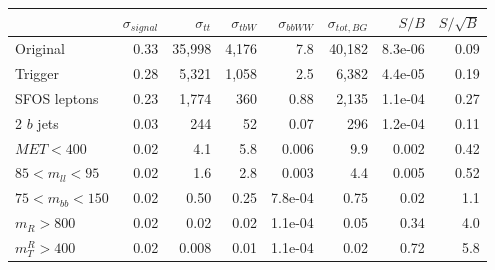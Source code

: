\begin{tabular}{lrrrrrrr}
\toprule
{} &  $\sigma_{signal}$ &  $\sigma_{tt}$ &  $\sigma_{tbW}$ &  $\sigma_{bbWW}$ &  $\sigma_{tot, BG}$ &   $S/B$ &  $S/\sqrt{B}$ \\
\midrule
Original            &               0.33 &         35,998 &           4,176 &              7.8 &             40,182 & 8.3e-06 &          0.09 \\
Trigger             &               0.28 &          5,321 &           1,058 &              2.5 &              6,382 & 4.4e-05 &          0.19 \\
SFOS leptons        &               0.23 &          1,774 &             360 &             0.88 &              2,135 & 1.1e-04 &          0.27 \\
2 $b$ jets          &               0.03 &            244 &              52 &             0.07 &                296 & 1.2e-04 &          0.11 \\
$MET < 400$         &               0.02 &            4.1 &             5.8 &            0.006 &                9.9 &   0.002 &          0.42 \\
$85 < m_{ll} < 95$  &               0.02 &            1.6 &             2.8 &            0.003 &                4.4 &   0.005 &          0.52 \\
$75 < m_{bb} < 150$ &               0.02 &           0.50 &            0.25 &          7.8e-04 &               0.75 &    0.02 &           1.1 \\
$m_{R} > 800$       &               0.02 &           0.02 &            0.02 &          1.1e-04 &               0.05 &    0.34 &           4.0 \\
$m_{T}^{R} > 400$   &               0.02 &          0.008 &            0.01 &          1.1e-04 &               0.02 &    0.72 &           5.8 \\
\bottomrule
\end{tabular}
